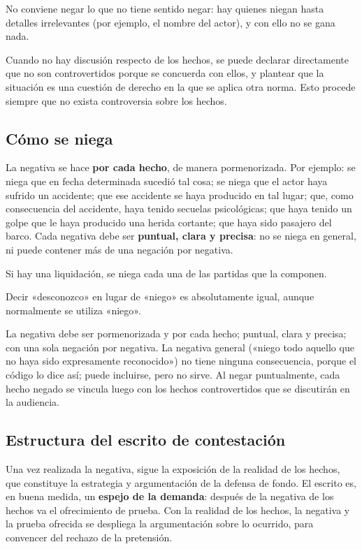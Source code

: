 \documentclass[12pt,oneside]{book}
\begin{document}
No conviene negar lo que no tiene sentido negar: hay quienes niegan hasta detalles irrelevantes (por ejemplo, el nombre del actor), y con ello no se gana nada.

Cuando no hay discusión respecto de los hechos, se puede declarar directamente que no son controvertidos porque se concuerda con ellos, y plantear que la situación es una cuestión de derecho en la que se aplica otra norma. Esto procede siempre que no exista controversia sobre los hechos.

\subsection{Cómo se niega}

La negativa se hace \textbf{por cada hecho}, de manera pormenorizada. Por ejemplo: se niega que en fecha determinada sucedió tal cosa; se niega que el actor haya sufrido un accidente; que ese accidente se haya producido en tal lugar; que, como consecuencia del accidente, haya tenido secuelas psicológicas; que haya tenido un golpe que le haya producido una herida cortante; que haya sido pasajero del barco. Cada negativa debe ser \textbf{puntual, clara y precisa}: no se niega en general, ni puede contener más de una negación por negativa.

Si hay una liquidación, se niega cada una de las partidas que la componen.

Decir «desconozco» en lugar de «niego» es absolutamente igual, aunque normalmente se utiliza «niego».

\begin{important}
La negativa debe ser pormenorizada y por cada hecho; puntual, clara y precisa; con una sola negación por negativa. La negativa general («niego todo aquello que no haya sido expresamente reconocido») no tiene ninguna consecuencia, porque el código lo dice así; puede incluirse, pero no sirve. Al negar puntualmente, cada hecho negado se vincula luego con los hechos controvertidos que se discutirán en la audiencia.
\end{important}

\subsection{Estructura del escrito de contestación}

Una vez realizada la negativa, sigue la exposición de la realidad de los hechos, que constituye la estrategia y argumentación de la defensa de fondo. El escrito es, en buena medida, un \textbf{espejo de la demanda}: después de la negativa de los hechos va el ofrecimiento de prueba. Con la realidad de los hechos, la negativa y la prueba ofrecida se despliega la argumentación sobre lo ocurrido, para convencer del rechazo de la pretensión.
\end{document}
